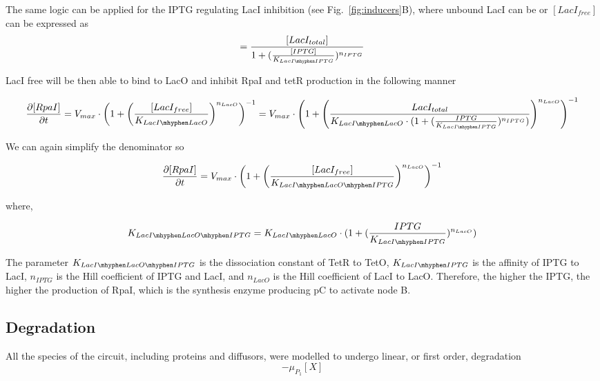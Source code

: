 The same logic can be applied for the IPTG regulating LacI inhibition (see Fig.~\ref{fig:inducers}B),
where unbound LacI can be or $[LacI_{free}]$ can be expressed as
\begin{equation}
[LacI{free}] =  \frac{[LacI_{total}]}{1+(\frac{[IPTG]}{K_{LacI \mhyphen IPTG}})^{n_{IPTG}}}
\end{equation}

LacI free will be then able to bind to LacO and inhibit RpaI and tetR production in the following manner

\begin{equation}
    \pdv{[RpaI]}{t} = V_{max}\cdot \left(1+\left(\frac{[LacI_{free}]}{K_{LacI \mhyphen LacO}}\right)^{n_{LacO}}\right)^{-1} = V_{max} \cdot \left(1+\left(\frac{LacI_{total}}{K_{LacI \mhyphen LacO}\cdot(1+(\frac{IPTG}{K_{LacI \mhyphen IPTG}})^{n_{IPTG}})}\right)^{n_{LacO}}\right)^{-1}
\end{equation}


We can again simplify the denominator so

\begin{equation}
    \pdv{[RpaI]}{t} = V_{max}\cdot \left(1+\left(\frac{[LacI_{free}]}{K_{LacI \mhyphen LacO \mhyphen IPTG }}\right)^{n_{LacO}}\right)^{-1}
\end{equation}

where,

\begin{equation}
    K_{LacI \mhyphen LacO \mhyphen IPTG} = K_{LacI \mhyphen LacO}\cdot(1+(\frac{IPTG}{K_{LacI \mhyphen IPTG}})^{n_{LacO}})
\end{equation}

The parameter $K_{LacI \mhyphen LacO \mhyphen IPTG}$ is the dissociation constant of TetR to TetO, $K_{LacI \mhyphen IPTG}$
is the affinity of IPTG to LacI, $n_{IPTG}$ is the Hill coefficient of IPTG and LacI,
and $n_{LacO}$ is the Hill coefficient of LacI to LacO.
Therefore, the higher the IPTG, the higher the production of RpaI, which is the synthesis enzyme producing pC to activate node B.




\subsection{Degradation}
All the species of the circuit, including proteins and diffusors,
were modelled to undergo linear, or first order, degradation
\begin{equation}
    -\mu_{P_{1}}[X]
    \label{linear degradation}
\end{equation}


